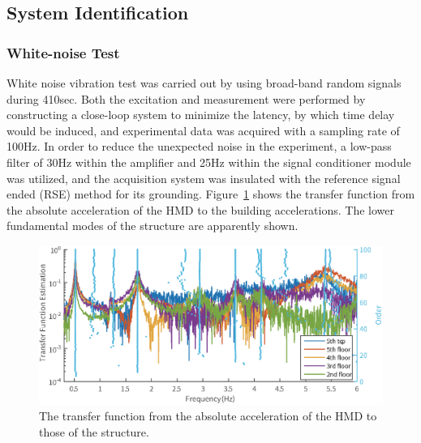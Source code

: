 \subsection{System Identification}
\subsubsection{White-noise Test}
White noise vibration test was carried out by using broad-band random signals during 410sec. Both the excitation and measurement were performed by constructing a close-loop system to minimize the latency, by which time delay would be induced, and experimental data was acquired with a sampling rate of 100Hz. In order to reduce the unexpected noise in the experiment, a low-pass filter of 30Hz within the amplifier and 25Hz within the signal conditioner module was utilized, and the acquisition system was insulated with the reference signal ended (RSE) method for its grounding.
Figure~\ref{fig:7-5} shows the transfer function from the absolute acceleration of the HMD to the building accelerations. The lower fundamental modes of the structure are apparently shown.

\begin{figure}[ht]
\centering
\includegraphics[width=1\textwidth] {figure/7-5.eps}
\caption{The transfer function from the absolute acceleration of the HMD to those of the structure.}
\label{fig:7-5}
\end{figure}



